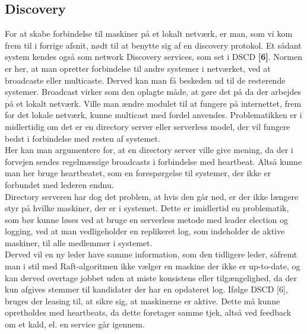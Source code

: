 \documentclass[a4paper,12pt]{article}
\begin{document}
\subsection{Discovery}
For at skabe forbindelse til maskiner på et lokalt netværk, er man, som vi kom frem til i forrige afsnit, nødt til at benytte sig af en discovery protokol. Et sådant system kendes også som network Discovery services, som set i DSCD \textbf{[6]}. Normen er her, at man opretter forbindelse til andre systemer i netværket, ved at broadcaste eller multicaste. Derved kan man få beskeden ud til de resterende systemer. Broadcast virker som den oplagte måde, at gøre det på da der arbejdes på et lokalt netværk.
Ville man ændre modulet til at fungere på internettet, frem for det lokale netværk, kunne multicast med fordel anvendes.
Problematikken er i midlertidig om det er en directory server eller serverless model, der vil fungere bedst i forbindelse med resten af systemet.
\\[5px]
Her kan man argumentere for, at en directory server ville give mening, da der i forvejen sendes regelmæssige broadcasts i forbindelse med heartbeat. Altså kunne man her bruge heartbeatet, som en forespørgelse til systemer, der ikke er forbundet med lederen endnu.
\\
Directory serveren har dog det problem, at hvis den går ned, er der ikke længere styr på hvilke maskiner, der er i systemet. Dette er imidlertid en problematik, som bør kunne løses ved at bruge en serverless metode med leader election og logging, ved at man vedligeholder en replikeret log, som indeholder de aktive maskiner, til alle medlemmer i systemet. 
\\
Derved vil en ny leder have samme information, som den tidligere leder, såfremt man i stil med Raft-algoritmen ikke vælger en maskine der ikke er up-to-date, og kan derved overtage jobbet uden at miste konsistens eller tilgængelighed, da der kun afgives stemmer til kandidater der har en opdateret log. Ifølge DSCD [6], bruges der leasing til, at sikre sig, at maskinerne er aktive. Dette må kunne opretholdes med heartbeats, da dette foretager samme tjek, altså ved feedback om et kald, el. en service går igennem.
\end{document}
